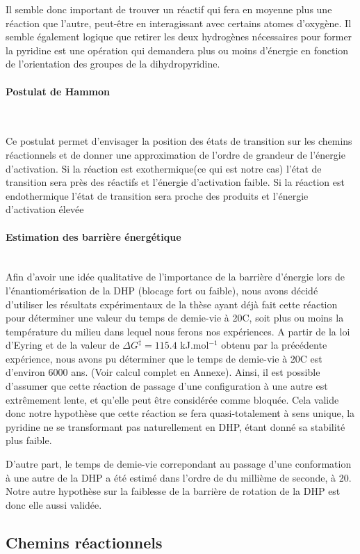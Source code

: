 \documentclass{article}
\newcommand{\pparagraph}[1]{\paragraph{#1}\mbox{}\\}
\begin{document}
\medbreak

Il semble donc important de trouver un réactif qui fera en moyenne plus une réaction que l'autre, peut-être en interagissant avec certains atomes d'oxygène. Il semble également logique que retirer les deux hydrogènes nécessaires pour former la pyridine est une opération qui demandera plus ou moins d'énergie en fonction de l'orientation des groupes de la dihydropyridine.

\medbreak

\pparagraph{Postulat de Hammon}
\par
Ce postulat permet d’envisager la position des états de transition sur les chemins réactionnels et de donner une approximation de l’ordre de grandeur de l’énergie d’activation.
Si la réaction est exothermique(ce qui est notre cas) l’état de transition sera près des réactifs et l’énergie d’activation faible.
Si la réaction est endothermique l’état de transition sera proche des produits et l’énergie d’activation élevée


\medbreak
\pparagraph{Estimation des barrière énergétique}

Afin d’avoir une idée qualitative de l’importance de la barrière d'énergie lors de l'énantiomérisation de la DHP (blocage fort ou faible), nous avons décidé d’utiliser les résultats expérimentaux de la thèse ayant déjà fait cette réaction pour déterminer une valeur du temps de demie-vie à 20\degree C, soit plus ou moins la température du milieu dans lequel nous ferons nos expériences.
\medbreak
A partir de la loi d’Eyring et de la valeur de $\Delta G^{\ddagger} = 115.4$ kJ.mol$^{-1}$ obtenu par la précédente expérience, nous avons pu déterminer que le temps de demie-vie à 20\degree C est d’environ 6000 ans. (Voir calcul complet en Annexe). Ainsi, il est possible d'assumer que cette réaction de passage d’une configuration à une autre est extrêmement lente, et qu'elle peut être considérée comme bloquée.
\medbreak
Cela valide donc notre hypothèse que cette réaction se fera quasi-totalement à sens unique, la pyridine ne se transformant pas naturellement en DHP, étant donné sa stabilité plus faible.
\medbreak

D'autre part, le temps de demie-vie correpondant au passage d'une conformation à une autre de la DHP a été estimé dans l'ordre de du millième de seconde, à 20\degree. Notre autre hypothèse sur la faiblesse de la barrière de rotation de la DHP est donc elle aussi validée.
\medbreak


\subsection{Chemins réactionnels}
\end{document}
